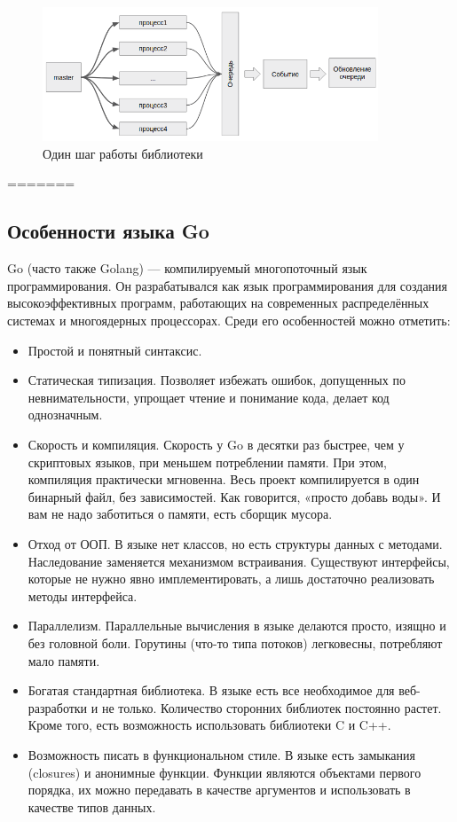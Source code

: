 \begin{figure}[!ht]
\centering
\includegraphics[width=10cm]{Kenenbek/images/libstep.png}
\caption{Один шаг работы библиотеки}
\label{fig:libstep}
\end{figure}

=======
\subsection{Особенности языка Go}
Go (часто также Golang) — компилируемый многопоточный язык программирования. Он разрабатывался как язык программирования для создания высокоэффективных программ, работающих на современных распределённых системах и многоядерных процессорах. Среди его особенностей можно отметить:

\begin{itemize}
\item Простой и понятный синтаксис.
\item Статическая типизация. Позволяет избежать ошибок, допущенных по невнимательности, упрощает чтение и понимание кода, делает код однозначным.
\item Скорость и компиляция. Скорость у Go в десятки раз быстрее, чем у скриптовых языков, при меньшем потреблении памяти. При этом, компиляция практически мгновенна. Весь проект компилируется в один бинарный файл, без зависимостей. Как говорится, «просто добавь воды». И вам не надо заботиться о памяти, есть сборщик мусора.
\item Отход от ООП. В языке нет классов, но есть структуры данных с методами. Наследование заменяется механизмом встраивания. Существуют интерфейсы, которые не нужно явно имплементировать, а лишь достаточно реализовать методы интерфейса.
\item Параллелизм. Параллельные вычисления в языке делаются просто, изящно и без головной боли. Горутины (что-то типа потоков) легковесны, потребляют мало памяти.
\item Богатая стандартная библиотека. В языке есть все необходимое для веб-разработки и не только. Количество сторонних библиотек постоянно растет. Кроме того, есть возможность использовать библиотеки C и C++.
\item Возможность писать в функциональном стиле. В языке есть замыкания (closures) и анонимные функции. Функции являются объектами первого порядка, их можно передавать в качестве аргументов и использовать в качестве типов данных.
\end{itemize}

